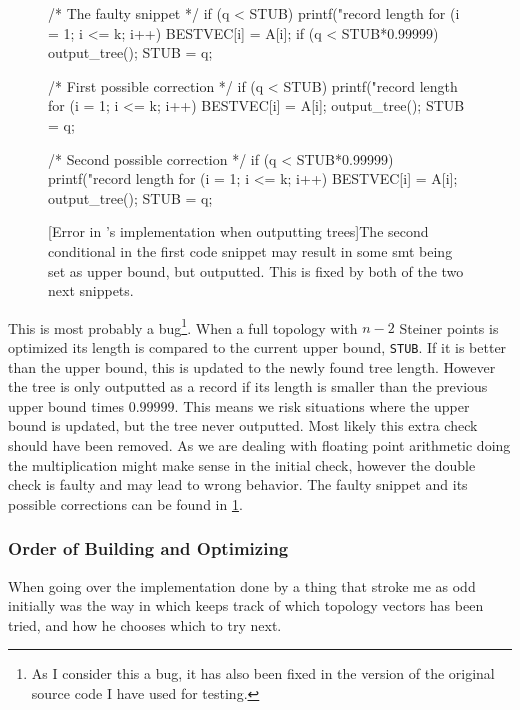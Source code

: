 \begin{figure}[htbp]
\begin{c-code}
/* The faulty snippet */
if (q < STUB) {
  printf("\nnew record length %
  for (i = 1; i <= k; i++) BESTVEC[i] = A[i];
  if (q < STUB*0.99999) output_tree();
  STUB = q;
}

/* First possible correction */
if (q < STUB) {
  printf("\nnew record length %
  for (i = 1; i <= k; i++) BESTVEC[i] = A[i];
  output_tree();
  STUB = q;
}

/* Second possible correction */
if (q < STUB*0.99999) {
  printf("\nnew record length %
  for (i = 1; i <= k; i++) BESTVEC[i] = A[i];
  output_tree();
  STUB = q;
}
\end{c-code}
  [Error in \citeauthor{smith1992}'s implementation when outputting trees]{The
    second conditional in the first code snippet may result in some \ac{smt}
    being set as upper bound, but outputted. This is fixed by both of the two
    next snippets.\label{fig:if-clause-snippet}}
\end{figure}

This is most probably a bug\footnote{As I consider this a bug, it has also been
  fixed in the version of the original source code I have used for
  testing.}. When a full topology with $n-2$ Steiner points is optimized its
length is compared to the current upper bound, \texttt{STUB}. If it is better
than the upper bound, this is updated to the newly found tree length. However
the tree is only outputted as a record if its length is smaller than the
previous upper bound times $0.99999$. This means we risk situations where the
upper bound is updated, but the tree never outputted. Most likely this extra
check should have been removed. As we are dealing with floating point arithmetic
doing the multiplication might make sense in the initial check, however the
double check is faulty and may lead to wrong behavior. The faulty snippet and
its possible corrections can be found in \cref{fig:if-clause-snippet}.

\subsubsection{Order of Building and Optimizing}
\label{sec:order-build-optim}

When going over the implementation done by \citeauthor{smith1992} a thing that
stroke me as odd initially was the way in which \citeauthor{smith1992} keeps
track of which topology vectors has been tried, and how he chooses which to try
next.

